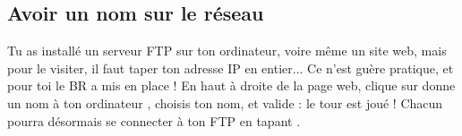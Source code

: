 \subsection{Avoir un nom sur le r\'eseau}
\label{dnsapp}

Tu as install\'e un serveur FTP sur ton ordinateur, voire m\^eme un site web, mais pour le visiter, il faut taper ton adresse IP en entier...
Ce n'est gu\`ere pratique, et pour toi le BR a mis en place  !
En haut \`a droite de la page web, clique sur \og donne un nom \`a ton ordinateur \fg, choisis ton nom, et valide : le tour est jou\'e ! Chacun pourra d\'esormais se connecter \`a ton FTP en tapant .
